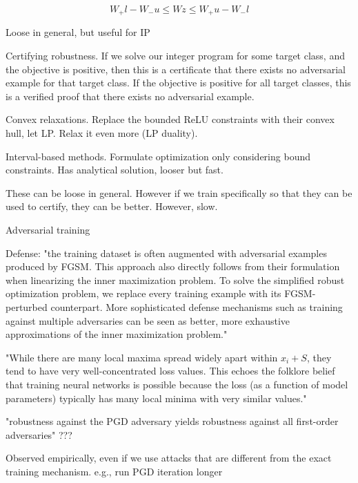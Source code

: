 \documentclass[english]{article}
\begin{document}
$$W_+l-W_-u\le Wz \le W_+u-W_-l$$

Loose in general, but useful for IP

\item Certifying robustness. If we solve our integer program for some target class, and the objective is positive, then this is a certificate that there exists no adversarial example for that target class. If the objective is positive for all target classes, this is a verified proof that there exists no adversarial example.

\item Convex relaxations. Replace the bounded ReLU constraints with their convex hull, let LP. Relax it even more (LP duality).

Interval-based methods. Formulate optimization only considering bound constraints. Has analytical solution, looser but fast.

These can be loose in general. However if we train specifically so that they can be used to certify, they can be better. However, slow.

\eenum 

\item Adversarial training
\benum 

\item Defense: "the training dataset is often augmented with adversarial examples produced
by FGSM. This approach also directly follows from their formulation when linearizing the inner maximization
problem. To solve the simplified robust optimization problem, we replace every training example
with its FGSM-perturbed counterpart. More sophisticated defense mechanisms such as training
against multiple adversaries can be seen as better, more exhaustive approximations of the inner
maximization problem."

\item "While there are many local maxima spread widely apart within
$x_i + S$, they tend to have very well-concentrated loss values. This echoes the folklore belief that
training neural networks is possible because the loss (as a function of model parameters) typically
has many local minima with very similar values."

\item "robustness against the PGD adversary yields
robustness against all first-order adversaries" ???

Observed empirically, even if we use attacks that are different from the exact training mechanism. e.g., run PGD iteration longer 
\end{document}

